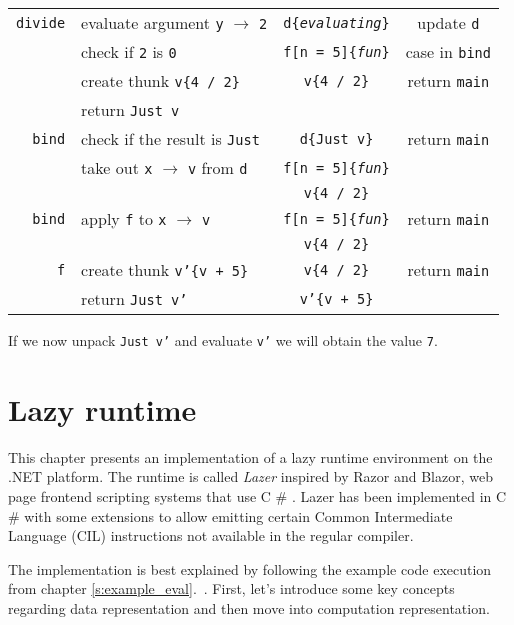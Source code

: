 \documentclass[en]{pracamgr}
\newcommand{\shrp}{%
  {\fontfamily{ppl}\selectfont\#%
  }}
\newcommand{\myref}[1]{\ref{#1}.~\textit{\nameref{#1}}}
\begin{document}
\begin{center}
\begin{tabular}{r | l | c | c }
    \hline
    \texttt{divide} & evaluate argument \texttt{y} $\rightarrow$ \texttt{2} & \texttt{d\{\textit{evaluating}\}} & update \texttt{d} \\
    & check if \texttt{2} is \texttt{0} & \texttt{f[n = 5]\{\textit{fun}\}} & case in \texttt{bind} \\
    & create thunk \texttt{v\{4 / 2\}}& \texttt{v\{4 / 2\}} & return \texttt{main} \\
    & return \texttt{Just v} & & \\
    \hline
    \texttt{bind} & check if the result is \texttt{Just} & \texttt{d\{Just v\}} & return \texttt{main} \\
    & take out \texttt{x} $\rightarrow$ \texttt{v} from \texttt{d} & \texttt{f[n = 5]\{\textit{fun}\}} & \\
    & & \texttt{v\{4 / 2\}} & \\
    \hline
    \texttt{bind} & apply \texttt{f} to \texttt{x} $\rightarrow$ \texttt{v} & \texttt{f[n = 5]\{\textit{fun}\}} & return \texttt{main} \\
    & & \texttt{v\{4 / 2\}} & \\
    \hline
    \texttt{f} & create thunk \texttt{v'\{v + 5\}} & \texttt{v\{4 / 2\}} & return \texttt{main} \\
    & return \texttt{Just v'}& \texttt{v'\{v + 5\}} & \\
    \hline
\end{tabular}
\end{center}

If we now unpack \texttt{Just v'} and evaluate \texttt{v'} we will obtain the value \texttt{7}.


\chapter{Lazy runtime}\label{r:runtime}

This chapter presents an implementation of a lazy runtime environment
on the .NET platform.
The runtime is called \textit{Lazer} inspired by Razor and Blazor,
web page frontend scripting systems that use C\shrp{}.
Lazer has been implemented in C\shrp{} with some
extensions to allow emitting certain Common Intermediate Language (CIL)
instructions not available in the regular compiler.

The implementation is best explained by following the example code execution
from chapter \myref{s:example_eval}.
First, let's introduce some key concepts regarding data representation
and then move into computation representation.
\end{document}
